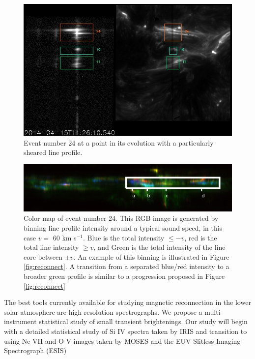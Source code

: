 \documentclass[]{aastex6}
\begin{document}
\begin{figure}
	
	\caption{Event number 24 at a point in its evolution with a particularly sheared line profile.}
	\centerline{\includegraphics[scale=.4]{NESSF_img/01481.jpg}}
	\label{fig:eemovie}
\end{figure}

\begin{figure}
	\caption{Color map of event number 24. This RGB image is generated by binning line profile intensity around a typical sound speed, in this case $v = $ 60 km s$^{-1}$.  Blue is the total intensity  $\leq -v$, red is the total line intensity $\geq v$, and Green is the total intensity of the line core between $\pm v$. An example of this binning is illustrated in Figure \ref{fig:reconnect}.  A transition from a separated blue/red intensity to a broader green profile is similar to a progression proposed in Figure \ref{fig:reconnect}}
	\label{fig:eecolor}
	\centerline{\includegraphics[scale=2]{NESSF_img/ee_color.eps}}
	
\end{figure}

The best tools currently available for studying magnetic reconnection in the lower solar atmosphere are high resolution spectrographs.  We propose a multi-instrument statistical study of small transient brightenings.  Our study will begin with a detailed statistical study of Si IV spectra taken by IRIS and transition to using Ne VII and O V images taken by MOSES and the EUV Slitless Imaging Spectrograph (ESIS)
\end{document}

